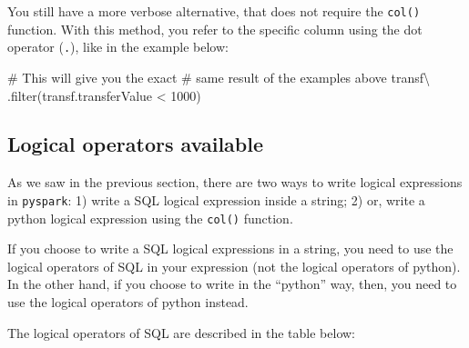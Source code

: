 \documentclass[
  11pt,
  letterpaper,
  DIV=11,
  numbers=noendperiod]{scrreprt}
\newenvironment{Shaded}{\begin{snugshade}}{\end{snugshade}}
\newcommand{\BuiltInTok}[1]{\textcolor[rgb]{0.00,0.23,0.31}{#1}}
\newcommand{\CommentTok}[1]{\textcolor[rgb]{0.37,0.37,0.37}{#1}}
\newcommand{\DecValTok}[1]{\textcolor[rgb]{0.68,0.00,0.00}{#1}}
\newcommand{\NormalTok}[1]{\textcolor[rgb]{0.00,0.23,0.31}{#1}}
\newcommand{\OperatorTok}[1]{\textcolor[rgb]{0.37,0.37,0.37}{#1}}
\begin{document}
You still have a more verbose alternative, that does not require the
\texttt{col()} function. With this method, you refer to the specific
column using the dot operator (\texttt{.}), like in the example below:

\begin{Shaded}
\begin{Highlighting}[]
\CommentTok{\# This will give you the exact}
\CommentTok{\# same result of the examples above}
\NormalTok{transf}\OperatorTok{\textbackslash{}}
\NormalTok{  .}\BuiltInTok{filter}\NormalTok{(transf.transferValue }\OperatorTok{\textless{}} \DecValTok{1000}\NormalTok{)}
\end{Highlighting}
\end{Shaded}

\hypertarget{logical-operators-available}{%
\subsection{Logical operators
available}\label{logical-operators-available}}

As we saw in the previous section, there are two ways to write logical
expressions in \texttt{pyspark}: 1) write a SQL logical expression
inside a string; 2) or, write a python logical expression using the
\texttt{col()} function.

If you choose to write a SQL logical expressions in a string, you need
to use the logical operators of SQL in your expression (not the logical
operators of python). In the other hand, if you choose to write in the
``python'' way, then, you need to use the logical operators of python
instead.

The logical operators of SQL are described in the table below:
\end{document}
